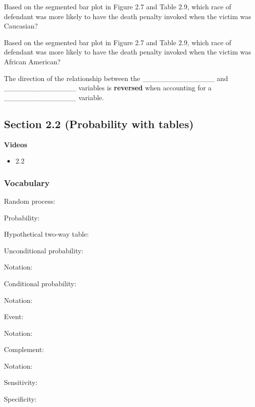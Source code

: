 \documentclass[
]{report}
\providecommand{\tightlist}{%
  \setlength{\itemsep}{0pt}\setlength{\parskip}{0pt}}
\newcommand{\rgs}{\vspace{12pt}} %
\newcommand{\rgi}{\hspace{24pt}}  %
\begin{document}
Based on the segmented bar plot in Figure 2.7 and Table 2.9, which race of defendant was more likely to have the death penalty invoked when the victim was Caucasian?
\rgs

Based on the segmented bar plot in Figure 2.7 and Table 2.9, which race of defendant was more likely to have the death penalty invoked when the victim was African American?
\rgs

The direction of the relationship between the \_\_\_\_\_\_\_\_\_\_\_\_\_\_
and \_\_\_\_\_\_\_\_\_\_\_\_\_\_ variables is \textbf{reversed} when accounting for
a \_\_\_\_\_\_\_\_\_\_\_\_\_\_ variable.
\rgs

\hypertarget{section-2.2-probability-with-tables}{%
\subsection*{Section 2.2 (Probability with tables)}\label{section-2.2-probability-with-tables}}


\textbf{Videos}

\begin{itemize}
\tightlist
\item
  2.2
\end{itemize}


\hypertarget{vocabulary-4}{%
\subsubsection*{Vocabulary}\label{vocabulary-4}}

Random process:
\rgs

Probability:
\rgs

Hypothetical two-way table:
\rgs

Unconditional probability:
\rgs

\rgi Notation:
\rgs

Conditional probability:
\rgs

\rgi Notation:
\rgs

Event:
\rgs

\rgi Notation:
\rgs

Complement:
\rgs

\rgi Notation:
\rgs

Sensitivity:
\rgs

Specificity:
\rgs
\end{document}
